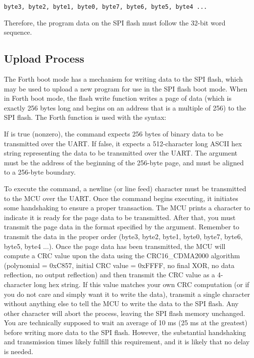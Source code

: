 \documentclass[11pt,pdftex,portrait,letterpaper]{article}
\begin{document}
\noindent\texttt{byte3, byte2, byte1, byte0, byte7, byte6, byte5, byte4 ...}

\noindent Therefore, the program data on the SPI flash must follow the 32-bit word sequence.

\subsection{Upload Process}
The Forth boot mode has a mechanism for writing data to the SPI flash, which may be used to upload a new program for use in the SPI flash boot mode. When in Forth boot mode, the flash write  function writes a page of data (which is exactly 256 bytes long and begins on an address that is a multiple of 256) to the SPI flash. The Forth function is used with the syntax:

\noindent{}

If  is true (nonzero), the command expects 256 bytes of binary data to be transmitted over the UART. If false, it expects a 512-character long ASCII hex string representing the data to be transmitted over the UART. The  argument must be the address of the beginning of the 256-byte page, and must be aligned to a 256-byte boundary.

To execute the command, a newline (or line feed) character must be transmitted to the MCU over the UART. Once the command begins executing, it initiates some handshaking to ensure a proper transaction. The MCU prints a \forthinline{\$} character to indicate it is ready for the page data to be transmitted. After that, you must transmit the page data in the format specified by the  argument. Remember to transmit the data in the proper order (byte3, byte2, byte1, byte0, byte7, byte6, byte5, byte4 ...). Once the page data has been transmitted, the MCU will compute a CRC value upon the data using the CRC16\_CDMA2000 algorithm (polynomial = 0xC857, initial CRC value = 0xFFFF, no final XOR, no data reflection, no output reflection) and then transmit the CRC value as a 4-character long hex string. If this value matches your own CRC computation (or if you do not care and simply want it to write the data), transmit a single  character without anything else to tell the MCU to write the data to the SPI flash. Any other character will abort the process, leaving the SPI flash memory unchanged. You are technically supposed to wait an average of 10 ms (25 ms at the greatest) before writing more data to the SPI flash. However, the substantial handshaking and transmission times likely fulfill this requirement, and it is likely that no delay is needed.
\end{document}
